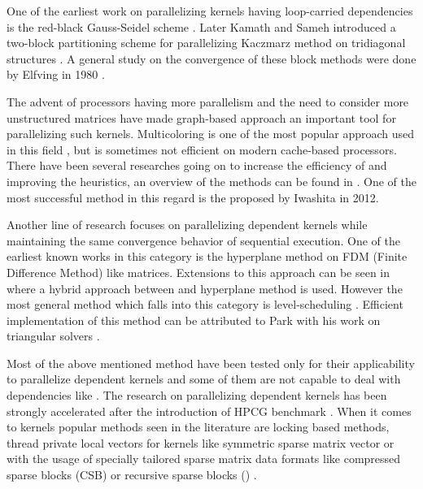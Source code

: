 One of the earliest work on parallelizing kernels having loop-carried dependencies is the red-black Gauss-Seidel scheme \cite{RBGS}. Later Kamath and Sameh introduced a two-block partitioning scheme for parallelizing Kaczmarz method on tridiagonal structures \cite{Kamath}. A general study on the convergence of these block methods were done by Elfving in 1980 \cite{Elfving1980}.

The advent of processors having more parallelism and the need to consider more unstructured matrices have made graph-based approach an important tool for parallelizing such kernels. Multicoloring is one of the most popular approach used in this field \cite{MC}, but is sometimes not efficient on modern cache-based processors. There have been several researches going on to increase the efficiency of \MCfull and improving the heuristics, an overview of the methods can be found in \cite{equitable_color}. One of the most successful method in this regard is the \ABMCfull \cite{ABMC} proposed by Iwashita \etal in 2012. 

Another line of research focuses on parallelizing dependent kernels while maintaining the same convergence behavior of sequential execution. One of the earliest known works in this category is the hyperplane method \cite{saad} on FDM (Finite Difference Method) like matrices. Extensions to this approach can be seen in \cite{cm-rcm} where a hybrid approach between \MCfull and hyperplane method is used. However the most general method which falls into this category is level-scheduling \cite{saad}.  Efficient implementation of this method can be attributed to Park \etal with his work on triangular solvers \cite{park_ls}.

Most of the above mentioned method have been tested only for their applicability to parallelize \DONE dependent kernels and some of them are not capable to deal with dependencies like \DTWO. The research on parallelizing \DONE dependent kernels has been strongly accelerated after the introduction of HPCG benchmark \cite{hpcg}. When it comes to \DTWO kernels popular methods seen in the literature are locking based methods, thread private local vectors \cite{thread_private_symm_spmv,sparseX} for kernels like symmetric sparse matrix vector or with the usage of specially tailored sparse matrix data formats like compressed sparse blocks (CSB) \cite{CSB} or recursive sparse blocks (\RSB) \cite{RSB}.